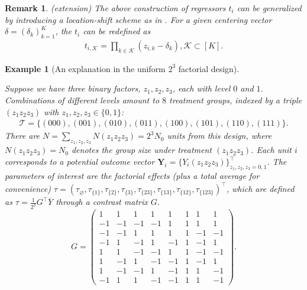 \documentclass[12pt]{article}
\newtheorem{remark}{Remark}
\newtheorem{example}{Example}
\begin{document}
\begin{remark} {\color{red} (extension)}
The above construction of regressors ${t}_i$ can be generalized by introducing a location-shift scheme as in \cite{zhao2021regression}. For a given centering vector ${\delta}=(\delta_k)_{k=1}^K$, the ${t}_i$ can be redefined as
\begin{align*}
t_{i,\mathcal{K}} = \prod_{k\in\mathcal{K}}\left(z_{i,k}-\delta_k\right),\mathcal{K}\subset [K].
\end{align*}
\end{remark}




\begin{example}[An explanation in the uniform $2^3$ factorial design]\label{exp:2-3-fac-design}



Suppose we have three binary factors, $z_1,z_2,z_3$, each with level $0$ and $1$. Combinations of different levels amount to $8$ treatment groups, indexed by a triple $(z_1z_2z_3)$ with $z_1,z_2,z_3\in\{0,1\}$:
\begin{align*}
\mathcal{T} = \{(000), (001), (010),(011),(100), (101), (110),(111)\}.
\end{align*}
There are $N=\sum_{z_1,z_2,z_3}N(z_1z_2z_3) = 2^3 N_0 $ units from this design, where $N(z_1z_2z_3) = N_0$ denotes the group size under treatment $(z_1z_2z_3)$. Each unit $i$ corresponds to a potential outcome vector $\bm{Y}_i = \{Y_i(z_1z_2z_3)\}_{z_1,z_2,z_3=0,1}^\top$. The  parameters of interest are the factorial effects (plus a total average for convenience) ${\tau}=\left(\tau_\varnothing, \tau_{\{1\}},\tau_{\{2\}},\tau_{\{3\}}, \tau_{\{23\}}, \tau_{\{13\}}, \tau_{\{12\}}, \tau_{\{123\}}\right)^\top$, which are defined as ${\tau} = \frac{1}{2^3} {G}^\top\overline{Y}$ through a contrast matrix ${G}$. 
\[
{G} = 
\begin{pmatrix}
1  & 1  & 1  & 1  & 1 & 1 & 1 & 1\\ 
-1 & -1 & -1 & -1 & 1 & 1 & 1 & 1\\
-1 & -1 & 1 & 1 & 1 & 1 & -1 & -1\\
-1 & 1 & -1 & 1 & -1 & 1 & -1 & 1\\
1 & 1 & -1 & -1 & 1 & 1 & -1 & -1\\
1 & -1 & 1 & -1 & -1 & 1 & -1 & 1\\
1 & -1 & -1 & 1 & -1 & 1 & 1 & -1\\
-1 & 1 & 1 & -1 & -1 & 1 & 1 & -1
\end{pmatrix}.
\]


\end{example}
\end{document}
